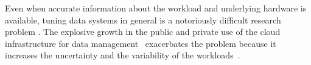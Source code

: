Even when accurate information about the workload and underlying hardware is 
available, tuning data systems in general is a notoriously difficult research 
problem \cite{Chaudhuri2004a,Chaudhuri2005,Shasha2002}. The explosive
growth in the public and private use of the cloud infrastructure for data
management~\cite{Hayes2008,Intel2011,GrandViewResearch2019} exacerbates the 
problem because it increases the uncertainty and the variability of the 
workloads~\cite{Chohan2010,Galante2012,Herbst2013,Holze2010,Mohan2016,Ozcan2017,Pezzini2014,Schnaitter2006,Schnaitter2007,
    Schnaitter2012,Wolski2017}. 
    
    
%
%



